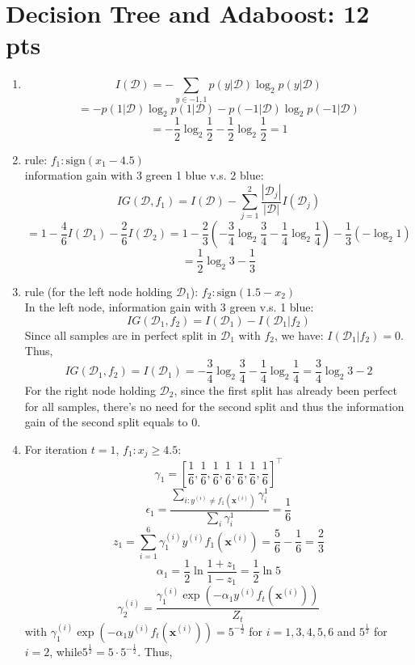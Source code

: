 \documentclass[12pt]{article}
\begin{document}
\section{Decision Tree and Adaboost: 12 pts}
\begin{enumerate}
    \item \[I(\mathcal{D}) = - \sum_{y\in{-1,1}}p(y|\mathcal{D})\log_2 p(y|\mathcal{D})\]
    \[= -p(1|\mathcal{D})\log_2p(1|\mathcal{D}) -p(-1|\mathcal{D})\log_2p(-1|\mathcal{D})\]
    \[= -\frac{1}{2}\log_2\frac{1}{2} - \frac{1}{2}\log_2\frac{1}{2} = 1\]
    \item rule: $f_1:\text{sign}(x_1 - 4.5)$\\
    information gain with 3 green 1 blue v.s. 2 blue:
    \[IG(\mathcal{D},f_1) = I(\mathcal{D}) - \sum_{j=1}^{2}\frac{|\mathcal{D}_j|}{|\mathcal{D}|}I(\mathcal{D}_j)\]
    \[= 1 - \frac{4}{6}I(\mathcal{D}_1) - \frac{2}{6}I(\mathcal{D}_2)
    = 1 - \frac{2}{3}(-\frac{3}{4}\log_2\frac{3}{4} - \frac{1}{4}\log_2\frac{1}{4}) - \frac{1}{3}(-\log_2 1)\]
    \[= \frac{1}{2}\log_2 3 - \frac{1}{3}\]
    \item rule (for the left node holding $\mathcal{D}_1$):
    $f_2: \text{sign}(1.5 - x_2)$\\
    In the left node, information gain with 3 green v.s. 1 blue:
    \[IG(\mathcal{D}_1,f_2) = I(\mathcal{D}_1) - I(\mathcal{D}_1|f_2)\] 
    Since all samples are in perfect split in $\mathcal{D}_1$ with $f_2$, we have:
    $I(\mathcal{D}_1|f_2) = 0$. Thus,
    \[IG(\mathcal{D}_1, f_2) = I(\mathcal{D}_1) = -\frac{3}{4}\log_2\frac{3}{4} - \frac{1}{4}\log_2\frac{1}{4} = \frac{3}{4}\log_2 3 - 2\]
    For the right node holding $\mathcal{D}_2$, since the first split has already been perfect for all samples, there's no need for the second split and thus the information gain of the second split equals to 0.
    \item For iteration $t = 1$, $f_1:x_j\geq4.5$:
    \[\gamma_1 = [\frac{1}{6}, \frac{1}{6},\frac{1}{6},\frac{1}{6},\frac{1}{6},\frac{1}{6},\frac{1}{6}]^{\top}\]
    \[\epsilon_1 = \frac{\sum_{i:y^{(i)}\neq f_1(\boldsymbol{x}^{(i)})}\gamma_i^1}{\sum_i\gamma_i^1} = \frac{1}{6}\]
    \[z_1 = \sum_{i=1}^6\gamma_1^{(i)}y^{(i)}f_1(\boldsymbol{x}^{(i)}) = \frac{5}{6} - \frac{1}{6} = \frac{2}{3}\]
    \[\alpha_1 = \frac{1}{2}\ln\frac{1+z_1}{1-z_1} = \frac{1}{2}\ln5\]
    \[\gamma_2^{(i)} = \frac{\gamma_1^{(i)}\exp(-\alpha_1y^{(i)}f_t(\boldsymbol{x}^{(i)}))}{Z_t}\]
    with $\gamma_1^{(i)}\exp(-\alpha_1y^{(i)}f_t(\boldsymbol{x}^{(i)})) = 5^{-\frac{1}{2}}$ for $i = 1, 3, 4, 5, 6$ and $5^{\frac{1}{2}}$ for $i = 2$, while\:$5^{\frac{1}{2}} = 5\cdot5^{-\frac{1}{2}}$. Thus,

\end{enumerate}
\end{document}
